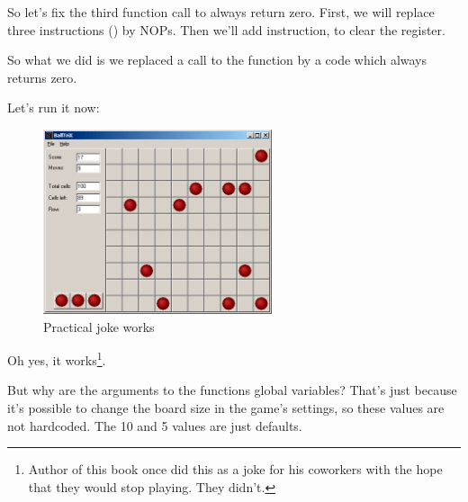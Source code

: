 So let's fix the third function call to always return zero.
First, we will replace three instructions () 
by \ac{NOP}s.
Then we'll add  instruction, 
to clear the \EAX register.



So what we did is we replaced a call to the  
function by a code which always returns zero.

\clearpage
Let's run it now:

\begin{figure}[H]
\centering
\includegraphics[width=0.6\textwidth]{examples/lines/2.png}
\caption{Practical joke works}
\end{figure}

Oh yes, it works\footnote{Author of this book once did this as a joke for his coworkers with 
the hope that they would stop playing. They didn't.}.

But why are the arguments to the  functions global variables?
That's just because it's possible to change the board size in the game's settings, 
so these values are not hardcoded.
The 10 and 5 values are just defaults.
